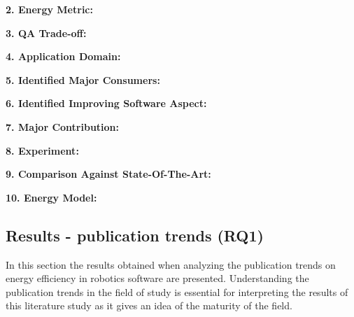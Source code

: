 \noindent\textbf{2. Energy Metric:}

\vspace{5mm}

\noindent\textbf{3. QA Trade-off:}

\vspace{5mm}

\noindent\textbf{4. Application Domain:}

\vspace{5mm}

\noindent\textbf{5. Identified Major Consumers:}

\vspace{5mm}

\noindent\textbf{6. Identified Improving Software Aspect:}

\vspace{5mm}

\noindent\textbf{7. Major Contribution:}

\vspace{5mm}

\noindent\textbf{8. Experiment:}

\vspace{5mm}

\noindent\textbf{9. Comparison Against State-Of-The-Art:}

\vspace{5mm}

\noindent\textbf{10. Energy Model:}


\subsection{Results - publication trends (RQ1)}
\label{sec:results:rq1_pub_trends}

In this section the results obtained when analyzing the publication trends on energy efficiency in robotics software are presented.
Understanding the publication trends in the field of study is essential for interpreting the results of this literature study as it gives
an idea of the maturity of the field.

